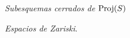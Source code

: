 \documentclass[twoside]{article}
\begin{document}
%
\newpage
%
\begin{ejercicio}{3.12}\emph{Subesquemas cerrados de $\operatorname{Proj}(S)$}

\end{ejercicio}
\begin{solucion}
\end{solucion}
\newpage
\begin{ejercicio}{3.17}\emph{Espacios de Zariski}. 


\end{ejercicio}
\begin{solucion}
%
\end{solucion}
\end{document}
